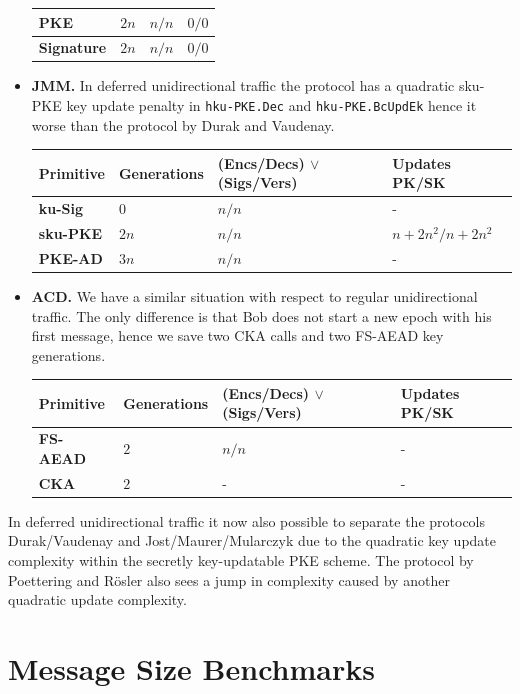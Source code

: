 \documentclass[11pt,a4paper,twoside,openright,bibliography=totoc]{scrbook}
\begin{document}
\begin{itemize}
\begin{center}
\begin{tabular}{ | l | l | l | l |}
    \textbf{PKE} & $2n$ & $n/n$ & $0/0$ \\ \hline
    \textbf{Signature} & $2n$ & $n/n$ & $0/0$ \\  
    \hline
    \end{tabular}
  \end{center}
\item \textbf{JMM.} In deferred unidirectional traffic the protocol
  has a quadratic sku-PKE key update penalty in \texttt{hku-PKE.Dec} and
  \texttt{hku-PKE.BcUpdEk} hence it worse than the protocol by Durak
  and Vaudenay.
  \begin{center}
    \begin{tabular}{ | l | l | l | l |}
    \hline
    Primitive & Generations & (Encs/Decs) $\vee$ (Sigs/Vers) & Updates PK/SK \\ \hline
    \textbf{ku-Sig} & $0$ & $n/n$ & - \\ \hline
    \textbf{sku-PKE} & $2n$ & $n/n$ & $n+2n^2/n+2n^2$ \\ \hline
    \textbf{PKE-AD} & $3n$ & $n/n$ & - \\
    \hline
    \end{tabular}
  \end{center}
\item \textbf{ACD.} We have a similar situation with respect to regular
  unidirectional traffic. The only difference is that Bob does not
  start a new epoch with his first message, hence we save two CKA calls
  and two FS-AEAD key generations.
  \begin{center}
    \begin{tabular}{ | l | l | l | l |}
    \hline
    Primitive & Generations & (Encs/Decs) $\vee$ (Sigs/Vers) & Updates PK/SK \\ \hline
    \textbf{FS-AEAD} & $2$ & $n/n$ & - \\ \hline
    \textbf{CKA} & $2$ & - & - \\  
    \hline
    \end{tabular}
  \end{center}
\end{itemize}

In deferred unidirectional traffic it now also possible to separate
the protocols Durak/Vaudenay and Jost/Maurer/Mularczyk due to
the quadratic key update complexity within the
secretly key-updatable PKE scheme. The protocol by Poettering
and Rösler also sees a jump in complexity caused by another
quadratic update complexity.

\section{Message Size Benchmarks}
\label{sec:ciph-size-benchm}
\end{document}
